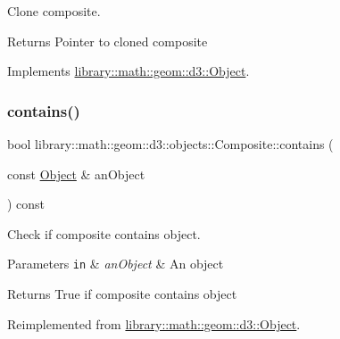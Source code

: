 Clone composite. 

\begin{DoxyReturn}{Returns}
Pointer to cloned composite 
\end{DoxyReturn}


Implements \hyperlink{classlibrary_1_1math_1_1geom_1_1d3_1_1_object_a1a784c6b359e0eb97cd34fabc42f2f3f}{library\+::math\+::geom\+::d3\+::\+Object}.

\mbox{\label{classlibrary_1_1math_1_1geom_1_1d3_1_1objects_1_1_composite_a3ec9ea04f09dea14be1e0f7eaa477c04}} 
\subsubsection{\texorpdfstring{contains()}{contains()}\hspace{0.1cm}{\footnotesize\ttfamily [1/2]}}
{\footnotesize\ttfamily bool library\+::math\+::geom\+::d3\+::objects\+::\+Composite\+::contains (\begin{DoxyParamCaption}\item[{const \hyperlink{classlibrary_1_1math_1_1geom_1_1d3_1_1_object}{Object} \&}]{an\+Object }\end{DoxyParamCaption}) const\hspace{0.3cm}{\ttfamily [virtual]}}



Check if composite contains object. 


\begin{DoxyParams}[1]{Parameters}
\mbox{\tt in}  & {\em an\+Object} & An object \\
\hline
\end{DoxyParams}
\begin{DoxyReturn}{Returns}
True if composite contains object 
\end{DoxyReturn}


Reimplemented from \hyperlink{classlibrary_1_1math_1_1geom_1_1d3_1_1_object_abaf45bf02ca165ba7bf685b24f5f97ef}{library\+::math\+::geom\+::d3\+::\+Object}.

\mbox{\label{classlibrary_1_1math_1_1geom_1_1d3_1_1objects_1_1_composite_a71c686259108546fd7a7415ff10bfea2}} 
